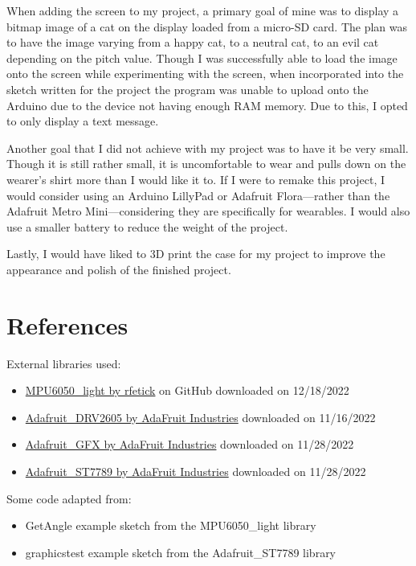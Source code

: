 When adding the screen to my project, a primary goal of mine was to display a bitmap image of a cat on the display loaded from a micro-SD card. The plan was to have the image varying from a happy cat, to a neutral cat, to an evil cat depending on the pitch value. Though I was successfully able to load the image onto the screen while experimenting with the screen, when incorporated into the sketch written for the project the program was unable to upload onto the Arduino due to the device not having enough RAM memory. Due to this, I opted to only display a text message.

Another goal that I did not achieve with my project was to have it be very small. Though it is still rather small, it is uncomfortable to wear and pulls down on the wearer's shirt more than I would like it to. If I were to remake this project, I would consider using an Arduino LillyPad or Adafruit Flora—rather than the Adafruit Metro Mini—considering they are specifically for wearables. I would also use a smaller battery to reduce the weight of the project.

Lastly, I would have liked to 3D print the case for my project to improve the appearance and polish of the finished project.



\newpage
\section*{References} %
External libraries used:
\begin{itemize}
	\item \href{https://github.com/rfetick/MPU6050\_light/}{MPU6050\_light by rfetick} on GitHub downloaded on 12/18/2022
	\item \href{https://github.com/adafruit/Adafruit\_DRV2605\_Library}{Adafruit\_DRV2605 by AdaFruit Industries} downloaded on 11/16/2022
	\item \href{https://github.com/adafruit/Adafruit-GFX-Library}{Adafruit\_GFX by AdaFruit Industries} downloaded on 11/28/2022
	\item \href{https://github.com/adafruit/Adafruit-ST7735-Library }{Adafruit\_ST7789 by AdaFruit Industries} downloaded on 11/28/2022 
\end{itemize}

{ \parindent0pt
Some code adapted from:
\begin{itemize}
	\item GetAngle example sketch from the MPU6050\_light library
	\item graphicstest example sketch from the Adafruit\_ST7789 library
\end{itemize}
}
